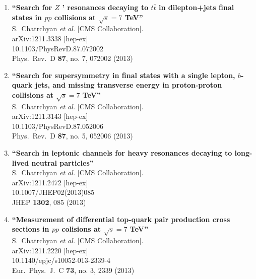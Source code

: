 \documentclass{article}
\begin{document}
\begin{enumerate}
\item%
{\bf ``Search for $Z$ ' resonances decaying to $t\bar{t}$ in dilepton+jets final states in $pp$ collisions at $\sqrt{s}=7$ TeV''}
  \\{}S.~Chatrchyan {\it et al.}  [CMS Collaboration].
  \\{}arXiv:1211.3338 [hep-ex]
    \\{}10.1103/PhysRevD.87.072002
\\{}Phys.\ Rev.\ D {\bf 87}, no. 7, 072002 (2013) %


\item%
{\bf ``Search for supersymmetry in final states with a single lepton, $b$-quark jets, and missing transverse energy in proton-proton collisions at $\sqrt{s}=7$ TeV''}
  \\{}S.~Chatrchyan {\it et al.}  [CMS Collaboration].
  \\{}arXiv:1211.3143 [hep-ex]
    \\{}10.1103/PhysRevD.87.052006
\\{}Phys.\ Rev.\ D {\bf 87}, no. 5, 052006 (2013) %


\item%
{\bf ``Search in leptonic channels for heavy resonances decaying to long-lived neutral particles''}
  \\{}S.~Chatrchyan {\it et al.}  [CMS Collaboration].
  \\{}arXiv:1211.2472 [hep-ex]
    \\{}10.1007/JHEP02(2013)085
\\{}JHEP {\bf 1302}, 085 (2013) %


\item%
{\bf ``Measurement of differential top-quark pair production cross sections in $pp$ colisions at $\sqrt{s}=7$ TeV''}
  \\{}S.~Chatrchyan {\it et al.}  [CMS Collaboration].
  \\{}arXiv:1211.2220 [hep-ex]
    \\{}10.1140/epjc/s10052-013-2339-4
\\{}Eur.\ Phys.\ J.\ C {\bf 73}, no. 3, 2339 (2013) %



\end{enumerate}
\end{document}
